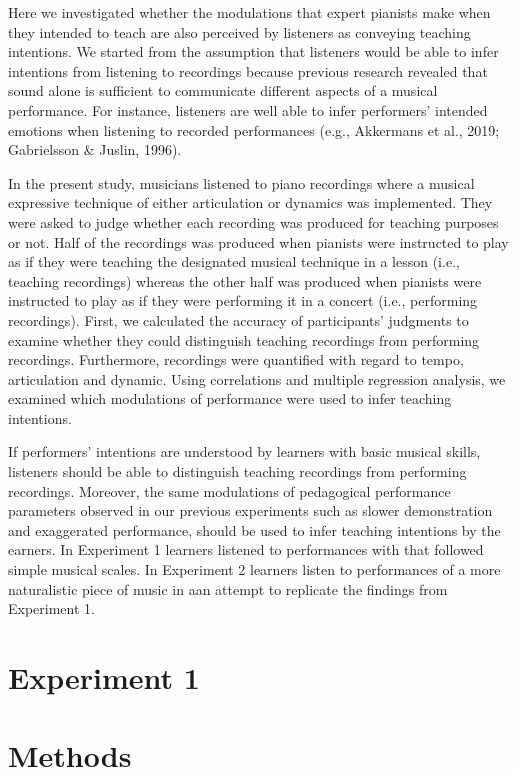 \documentclass[
  man,floatsintext]{apa6}
\begin{document}
Here we investigated whether the modulations that expert pianists make when they intended to teach are also perceived by listeners as conveying teaching intentions. We started from the assumption that listeners would be able to infer intentions from listening to recordings because previous research revealed that sound alone is sufficient to communicate different aspects of a musical performance. For instance, listeners are well able to infer performers' intended emotions when listening to recorded performances (e.g., Akkermans et al., 2019; Gabrielsson \& Juslin, 1996).

In the present study, musicians listened to piano recordings where a musical expressive technique of either articulation or dynamics was implemented. They were asked to judge whether each recording was produced for teaching purposes or not. Half of the recordings was produced when pianists were instructed to play as if they were teaching the designated musical technique in a lesson (i.e., teaching recordings) whereas the other half was produced when pianists were instructed to play as if they were performing it in a concert (i.e., performing recordings). First, we calculated the accuracy of participants' judgments to examine whether they could distinguish teaching recordings from performing recordings. Furthermore, recordings were quantified with regard to tempo, articulation and dynamic. Using correlations and multiple regression analysis, we examined which modulations of performance were used to infer teaching intentions.

If performers' intentions are understood by learners with basic musical skills, listeners should be able to distinguish teaching recordings from performing recordings. Moreover, the same modulations of pedagogical performance parameters observed in our previous experiments such as slower demonstration and exaggerated performance, should be used to infer teaching intentions by the earners. In Experiment 1 learners listened to performances with that followed simple musical scales. In Experiment 2 learners listen to performances of a more naturalistic piece of music in aan attempt to replicate the findings from Experiment 1.

\hypertarget{experiment-1}{%
\section{Experiment 1}\label{experiment-1}}

\hypertarget{methods}{%
\section{Methods}\label{methods}}
\end{document}
